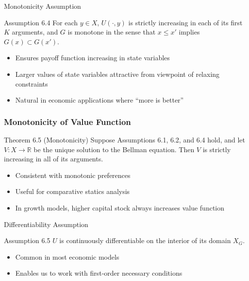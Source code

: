 \documentclass[9pt,aspectratio=169]{beamer}
\begin{document}
\begin{frame}{Monotonicity Assumption}
\begin{block}{Assumption 6.4}
    For each $y \in X$, $U(\cdot, y)$ is strictly increasing in each of its
    first $K$ arguments, and $G$ is monotone in the sense that $x \leq x'$
    implies $G(x) \subset G(x')$.
\end{block}

\begin{itemize}
\item Ensures payoff function increasing in state variables
\item Larger values of state variables attractive from viewpoint of relaxing constraints
\item Natural in economic applications where ``more is better''
\end{itemize}
\end{frame}

\begin{frame}
\frametitle{Monotonicity of Value Function}

\begin{block}{Theorem 6.5 (Monotonicity)}
Suppose Assumptions 6.1, 6.2, and 6.4 hold, and let $V: X \to \mathbb{R}$ be the unique solution to the Bellman equation. Then $V$ is strictly increasing in all of its arguments.
\end{block}

\begin{itemize}
    \item Consistent with monotonic preferences
    \item Useful for comparative statics analysis
    \item In growth models, higher capital stock always increases value
    function
\end{itemize}

\end{frame}

\begin{frame}{Differentiability Assumption}
\begin{block}{Assumption 6.5}
$U$ is continuously differentiable on the interior of its domain $X_G$.
\end{block}

\begin{itemize}
    \item Common in most economic models
    \item Enables us to work with first-order necessary conditions
\end{itemize}
\end{frame}
\end{document}
